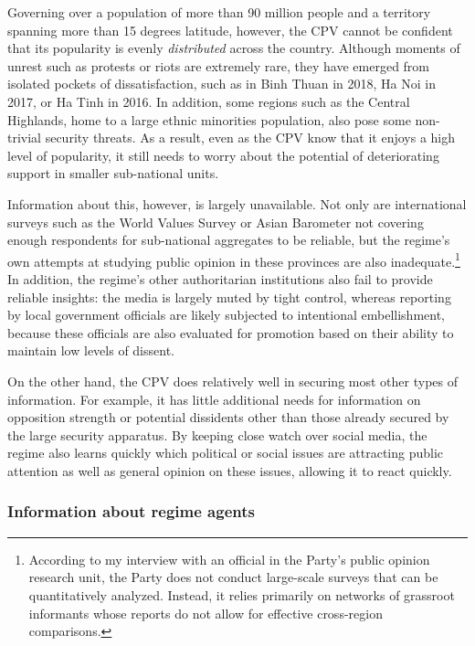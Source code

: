 \documentclass[12pt]{article}
\newcommand{\1}{\mathbbm{1}}
\begin{document}
Governing over a population of more than 90 million people and a territory spanning more than 15 degrees latitude, however, the CPV cannot be confident that its popularity is evenly \textit{distributed} across the country. Although moments of unrest such as protests or riots are extremely rare, they have emerged from isolated pockets of dissatisfaction, such as in Binh Thuan in 2018, Ha Noi in 2017, or Ha Tinh in 2016. In addition, some regions such as the Central Highlands, home to a large ethnic minorities population, also pose some non-trivial security threats. As a result, even as the CPV know that it enjoys a high level of popularity, it still needs to worry about the potential of deteriorating support in smaller sub-national units. 

Information about this, however, is largely unavailable. Not only are international surveys such as the World Values Survey or Asian Barometer not covering enough respondents for sub-national aggregates to be reliable, but the regime's own attempts at studying public opinion in these provinces are also inadequate.\footnote{According to my interview with an official in the Party's public opinion research unit, the Party does not conduct large-scale surveys that can be quantitatively analyzed. Instead, it relies primarily on networks of grassroot informants whose reports do not allow for effective cross-region comparisons.} In addition, the regime's other authoritarian institutions also fail to provide reliable insights: the media is largely muted by tight control, whereas reporting by local government officials are likely subjected to intentional embellishment, because these officials are also evaluated for promotion based on their ability to maintain low levels of dissent.

On the other hand, the CPV does relatively well in securing most other types of information. For example, it has little additional needs for information on opposition strength or potential dissidents other than those already secured by the large security apparatus. By keeping close watch over social media, the regime also learns quickly which political or social issues are attracting public attention as well as general opinion on these issues, allowing it to react quickly. 

\subsubsection{Information about regime agents}
\end{document}
